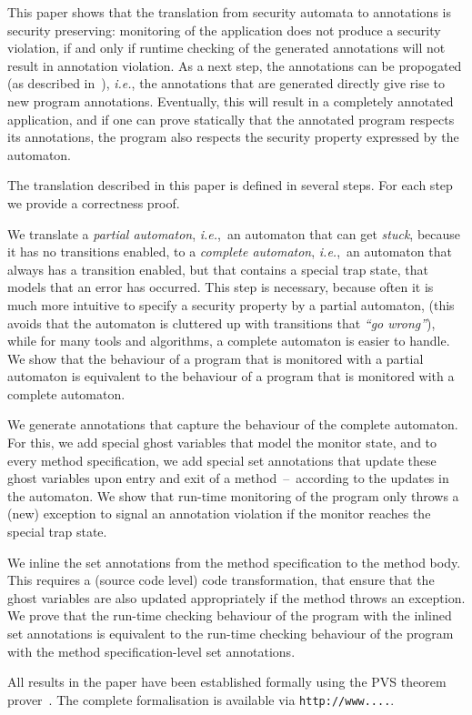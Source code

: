 This paper shows that the translation from security automata to
annotations is security preserving: monitoring of the application does
not produce a security violation, if and only if runtime checking of
the generated annotations will not result in annotation violation. As
a next step, the annotations can be propogated (as described
in~\cite{PavlovaBBHL04}), \emph{i.e.}, the annotations that are
generated directly give rise to new program annotations. Eventually,
this will result in a completely annotated application, and if one can
prove statically that the annotated program respects its annotations,
the program also respects the security property expressed by the automaton.

The translation described in this paper is defined in several
steps. For each step we provide a correctness proof.
\begin{inparaenum}
\item We translate a \emph{partial automaton},
\emph{i.e.},\ an automaton that can get \emph{stuck}, because it has
no transitions enabled, to a \emph{complete automaton}, \emph{i.e.},\ an
automaton that always has a transition enabled, but that contains a
special trap state, that models that an error has occurred.
This step is necessary, because often it is much more intuitive to
specify a security property by a partial automaton, (this
avoids that the automaton is cluttered up with transitions that
\emph{``go wrong''}), while for many tools and algorithms, a complete
automaton is easier to handle. We show that the behaviour of a program
that is monitored with a partial automaton is equivalent to the
behaviour of a program that is monitored with a complete
automaton. 
\item We generate annotations that capture the behaviour of the complete automaton. For this, we add special ghost variables that model the
monitor state, and to every method specification, we add special
\textsf{set} annotations that update these ghost variables upon entry
and exit of a method~--~according to the updates in the automaton. 
We show that run-time monitoring of the program
only throws a (new) exception to signal an annotation violation if the
monitor reaches the special trap state. 
\item We inline the
\textsf{set} annotations from the method specification to the method
body. This requires a (source code level) code transformation, that
ensure that the ghost variables are also updated appropriately if the
method throws an exception. We prove that the run-time checking
behaviour of the program with the inlined \textsf{set} annotations is
equivalent to the run-time checking behaviour of the program with the
method specification-level \textsf{set} annotations. 
\end{inparaenum}
All results in the paper have been established formally using
the PVS theorem prover~\cite{OwreRRSS96}. The complete formalisation
is available via
\texttt{http://www....}. 

